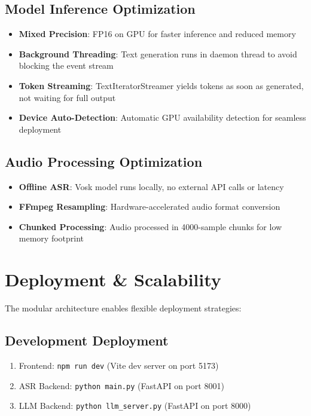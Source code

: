 \documentclass[12pt,a4paper]{report}
\begin{document}
\subsection{Model Inference Optimization}

\begin{itemize}
    \item \textbf{Mixed Precision}: FP16 on GPU for faster inference and reduced memory
    \item \textbf{Background Threading}: Text generation runs in daemon thread to avoid blocking the event stream
    \item \textbf{Token Streaming}: TextIteratorStreamer yields tokens as soon as generated, not waiting for full output
    \item \textbf{Device Auto-Detection}: Automatic GPU availability detection for seamless deployment
\end{itemize}

\subsection{Audio Processing Optimization}

\begin{itemize}
    \item \textbf{Offline ASR}: Vosk model runs locally, no external API calls or latency
    \item \textbf{FFmpeg Resampling}: Hardware-accelerated audio format conversion
    \item \textbf{Chunked Processing}: Audio processed in 4000-sample chunks for low memory footprint
\end{itemize}

\section{Deployment \& Scalability}

The modular architecture enables flexible deployment strategies:

\subsection{Development Deployment}

\begin{enumerate}
    \item Frontend: \texttt{npm run dev} (Vite dev server on port 5173)
    \item ASR Backend: \texttt{python main.py} (FastAPI on port 8001)
    \item LLM Backend: \texttt{python llm\_server.py} (FastAPI on port 8000)
\end{enumerate}
\end{document}
